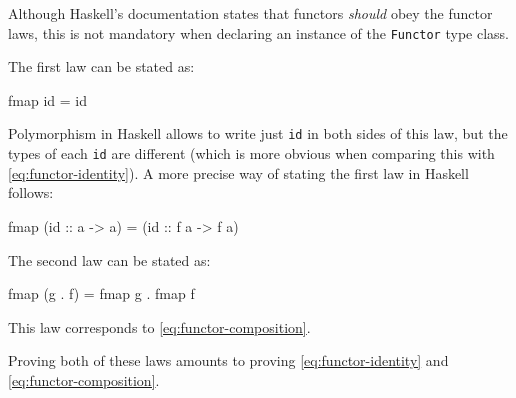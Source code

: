 



Although Haskell's documentation states that functors \emph{should}
obey the functor laws, this is not mandatory when declaring an instance
of the \texttt{Functor} type class.

The first law can be stated as:
\begin{codehaskell}
  fmap id = id
\end{codehaskell}
Polymorphism in Haskell allows to write just \texttt{id} in both sides of this
law, but the types of each \texttt{id} are different (which is more
obvious when comparing this with \eqref{eq:functor-identity}). A more precise way
of stating the first law in Haskell follows:
\begin{codehaskell}
  fmap (id :: a -> a) = (id :: f a -> f a)
\end{codehaskell}


The second law can be stated as:
\begin{codehaskell}
  fmap (g . f) = fmap g . fmap f
\end{codehaskell}
This law corresponds to \eqref{eq:functor-composition}.

Proving both of these laws amounts to proving \eqref{eq:functor-identity} and
\eqref{eq:functor-composition}.


